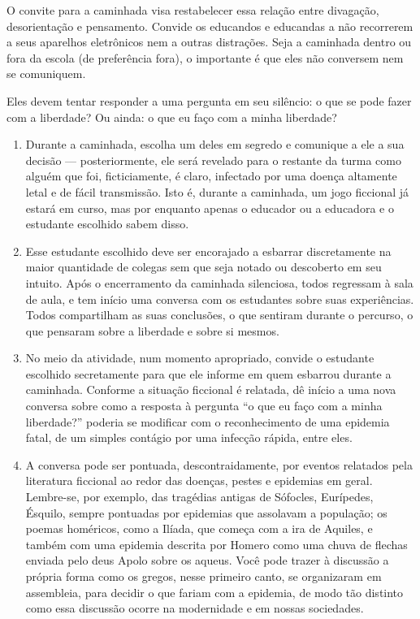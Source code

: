 \documentclass[12pt]{extarticle}
\begin{document}
O convite para a caminhada visa restabelecer essa relação entre
divagação, desorientação e pensamento. Convide os educandos e educandas
a não recorrerem a seus aparelhos eletrônicos nem a outras distrações.
Seja a caminhada dentro ou fora da escola (de preferência fora), o
importante é que eles não conversem nem se comuniquem.

Eles devem tentar responder a uma pergunta em seu silêncio: o que se
pode fazer com a liberdade? Ou ainda: o que eu faço com a minha
liberdade?

\begin{enumerate}
\item Durante a caminhada, escolha um deles em segredo e comunique a ele a sua
decisão --- posteriormente, ele será revelado para o restante da turma
como alguém que foi, ficticiamente, é claro, infectado por uma doença
altamente letal e de fácil transmissão. Isto é, durante a caminhada, um
jogo ficcional já estará em curso, mas por enquanto apenas o educador ou
a educadora e o estudante escolhido sabem disso.

\item Esse estudante escolhido deve ser encorajado a esbarrar discretamente na
maior quantidade de colegas sem que seja notado ou descoberto em seu
intuito. Após o encerramento da caminhada silenciosa, todos regressam à
sala de aula, e tem início uma conversa com os estudantes sobre suas
experiências. Todos compartilham as suas conclusões, o que sentiram
durante o percurso, o que pensaram sobre a liberdade e sobre si mesmos.

\item No meio da atividade, num momento apropriado, convide o estudante
escolhido secretamente para que ele informe em quem esbarrou durante a
caminhada. Conforme a situação ficcional é relatada, dê início a uma
nova conversa sobre como a resposta à pergunta ``o que eu faço com a
minha liberdade?'' poderia se modificar com o reconhecimento de uma
epidemia fatal, de um simples contágio por uma infecção rápida, entre
eles.

\item A conversa pode ser pontuada, descontraidamente, por eventos relatados
pela literatura ficcional ao redor das doenças, pestes e epidemias em
geral. Lembre-se, por exemplo, das tragédias antigas de Sófocles,
Eurípedes, Ésquilo, sempre pontuadas por epidemias que assolavam a
população; os poemas homéricos, como a Ilíada, que começa com a ira de
Aquiles, e também com uma epidemia descrita por Homero como uma chuva de
flechas enviada pelo deus Apolo sobre os aqueus. Você pode trazer à
discussão a própria forma como os gregos, nesse primeiro canto, se
organizaram em assembleia, para decidir o que fariam com a epidemia, de
modo tão distinto como essa discussão ocorre na modernidade e em nossas
sociedades.


\end{enumerate}
\end{document}
